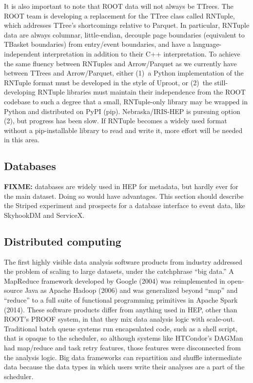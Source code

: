\documentclass{article}
\begin{document}
It is also important to note that ROOT data will not always be TTrees. The ROOT team is developing a replacement for the TTree class called RNTuple, which addresses TTree's shortcomings relative to Parquet. In particular, RNTuple data are always columnar, little-endian, decouple page boundaries (equivalent to TBasket boundaries) from entry/event boundaries, and have a language-independent interpretation in addition to their C++ interpretation. To achieve the same fluency between RNTuples and Arrow/Parquet as we currently have between TTrees and Arrow/Parquet, either (1)~a Python implementation of the RNTuple format must be developed in the style of Uproot, or (2)~the still-developing RNTuple libraries must maintain their independence from the ROOT codebase to such a degree that a small, RNTuple-only library may be wrapped in Python and distributed on PyPI (pip). Nebraska/IRIS-HEP is pursuing option (2), but progress has been slow. If RNTuple becomes a widely used format without a pip-installable library to read and write it, more effort will be needed in this area.

\subsection{Databases}

{\bf FIXME:} databases are widely used in HEP for metadata, but hardly ever for the main dataset. Doing so would have advantages. This section should describe the Striped experiment and prospects for a database interface to event data, like SkyhookDM and ServiceX.

\subsection{Distributed computing}

The first highly visible data analysis software products from industry addressed the problem of scaling to large datasets, under the catchphrase ``big data.'' A MapReduce framework developed by Google (2004) was reimplemented in open-source Java as Apache Hadoop (2006) and was generalized beyond ``map'' and ``reduce'' to a full suite of functional programming primitives in Apache Spark (2014). These software products differ from anything used in HEP, other than ROOT's PROOF system, in that they mix data analysis logic with scale-out. Traditional batch queue systems run encapsulated code, such as a shell script, that is opaque to the scheduler, so although systems like HTCondor's DAGMan had map/reduce and task retry features, those features were disconnected from the analysis logic. Big data frameworks can repartition and shuffle intermediate data because the data types in which users write their analyses are a part of the scheduler.
\end{document}
